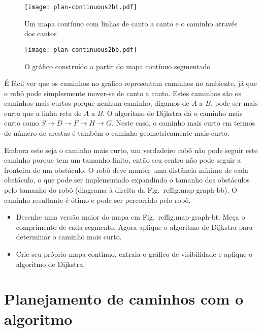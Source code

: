 {\begin{figure}
\begin{center}
\texttt{[image: plan-continuous2bt.pdf]}
\end{center}
\caption{Um mapa contínuo com linhas de canto a canto e o caminho através dos cantos}\label{fig.map-graph-bt}
\end{figure}

\begin{figure}
\begin{center}
\texttt{[image: plan-continuous2bb.pdf]}
\end{center}
\caption{O gráfico construído a partir do mapa contínuo segmentado}\label{fig.map-graph-bb}
\end{figure}

É fácil ver que os caminhos no gráfico representam caminhos no ambiente, já que o robô pode simplesmente mover-se de canto a canto. Estes caminhos são os caminhos mais curtos porque nenhum caminho, digamos de $A$ a $B$, pode ser mais curto que a linha reta de $A$ a $B$. O algoritmo de Dijkstra dá o caminho mais curto como $S\rightarrow D\rightarrow F\rightarrow H\rightarrow G$. Neste caso, o caminho mais curto em termos de número de arestas é também o caminho geometricamente mais curto.

Embora este seja o caminho mais curto, um verdadeiro robô não pode seguir este caminho porque tem um tamanho finito, então seu centro não pode seguir a fronteira de um obstáculo. O robô deve manter uma distância mínima de cada obstáculo, o que pode ser implementado expandindo o tamanho dos obstáculos pelo tamanho do robô (diagrama à direita da Fig.~ref{fig.map-graph-bb}). O caminho resultante é ótimo e pode ser percorrido pelo robô.

\begin{framed}
\begin{itemize}
\item Desenhe uma versão maior do mapa em Fig.~ref{fig.map-graph-bt}. Meça o comprimento de cada segmento. Agora aplique o algoritmo de Dijkstra para determinar o caminho mais curto.
\item Crie seu próprio mapa contínuo, extraia o gráfico de visibilidade e aplique o algoritmo de Dijkstra.
\end{itemize}
\end{framed}

\section{Planejamento de caminhos com o algoritmo \astar}\label{s.astar}

}
